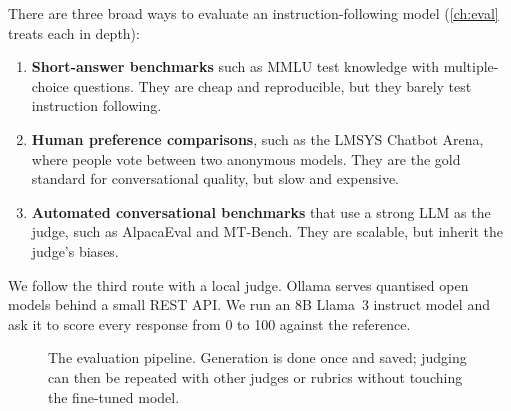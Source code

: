 There are three broad ways to evaluate an instruction-following model
(\cref{ch:eval} treats each in depth):
\begin{enumerate}
\item \textbf{Short-answer benchmarks} such as MMLU test knowledge with multiple-choice
questions. They are cheap and reproducible, but they barely test instruction following.
\item \textbf{Human preference comparisons}, such as the LMSYS Chatbot Arena, where
people vote between two anonymous models. They are the gold standard for
conversational quality, but slow and expensive.
\item \textbf{Automated conversational benchmarks} that use a strong LLM as the judge,
such as AlpacaEval and MT-Bench. They are scalable, but inherit the judge's biases.
\end{enumerate}

We follow the third route with a local judge. Ollama serves quantised open models
behind a small REST API. We run an 8B Llama~3 instruct model and ask it to score
every response from 0 to 100 against the reference.

\begin{figure}[ht]
\centering
{}
\caption{The evaluation pipeline. Generation is done once and saved; judging can then be
repeated with other judges or rubrics without touching the fine-tuned model.}
\label{fig:instruct:judge}
\end{figure}


